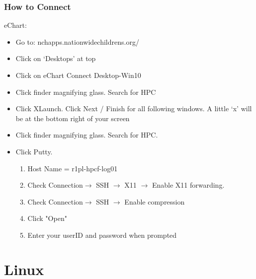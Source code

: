 \documentclass{beamer}
\begin{document}
\begin{frame}
\frametitle{How to Connect}
eChart:
\begin{itemize}
    \item Go to: nchapps.nationwidechildrens.org/
    \pause
    \item Click on ‘Desktops’ at top
    \pause
    \item Click on eChart Connect Desktop-Win10
    \pause
    \item Click finder magnifying glass. Search for HPC
    \pause
    \item Click XLaunch. Click Next / Finish for all following windows.  A little ‘x’ will
          be at the bottom right of your screen
    \pause
    \item Click finder magnifying glass. Search for HPC.
    \pause
    \item Click Putty. 
    \pause
    \begin{enumerate}
        \item Host Name = r1pl-hpcf-log01
        \pause
        \item Check Connection$\rightarrow$ SSH $\rightarrow$ X11 $\rightarrow$ Enable X11 forwarding. 
        \pause
        \item Check Connection$\rightarrow$ SSH $\rightarrow$ Enable compression
        \pause
        \item Click "Open"
        \pause
        \item Enter your userID and password when prompted
    \end{enumerate}
\end{itemize}
\end{frame}


 
\section{Linux}
\end{document}
